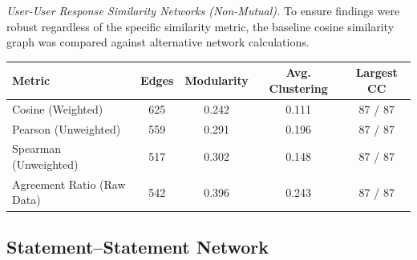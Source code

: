 \documentclass[11pt]{article}
\begin{document}
\textit{User-User Response Similarity Networks (Non-Mutual).} To ensure findings
were robust regardless of the specific similarity metric, the baseline cosine similarity graph was compared
against alternative network calculations.

\begin{center}
\small
\begin{tabular}{lcccc}
\toprule
\textbf{Metric} & \textbf{Edges} & \textbf{Modularity} & \textbf{Avg. Clustering} & \textbf{Largest CC} \\
\midrule
Cosine (Weighted)  & 625 & 0.242 & 0.111   & 87 / 87 \\
Pearson (Unweighted)            & 559 & 0.291 & 0.196 & 87 / 87 \\
Spearman (Unweighted)           & 517 & 0.302 & 0.148 & 87 / 87 \\
Agreement Ratio (Raw Data)      & 542 & 0.396 & 0.243 & 87 / 87 \\
\bottomrule
\end{tabular}
\end{center}

\subsection{Statement--Statement Network}
\end{document}
